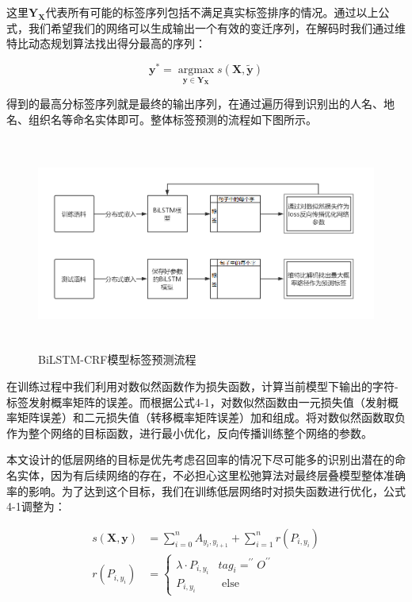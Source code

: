 \documentclass[winfonts,master,oneside,nobackinfo]{njuthesis}
\begin{document}
这里$\bm{Y}_{\bm{X}}$代表所有可能的标签序列包括不满足真实标签排序的情况。通过以上公式，我们希望我们的网络可以生成输出一个有效的变迁序列，在解码时我们通过维特比动态规划算法找出得分最高的序列：

\begin{equation} 
\bm{y}^{*}=\underset{\bm{y} \in \bm{Y}_{\bm{X}}}{\operatorname{argmax}} s(\bm{X}, \widetilde{\bm{y}})
\end{equation}

得到的最高分标签序列就是最终的输出序列，在通过遍历得到识别出的人名、地名、组织名等命名实体即可。整体标签预测的流程如下图所示。

\begin{figure}[H]
\centering
\begin{minipage}[t]{\textwidth}
\includegraphics[width=1\textwidth,height=7cm]{./figure/标签预测流程.jpg}
\caption{BiLSTM-CRF模型标签预测流程}
\label{lab:1}
\end{minipage}
\end{figure}

在训练过程中我们利用对数似然函数作为损失函数，计算当前模型下输出的字符-标签发射概率矩阵的误差。而根据公式4-1，对数似然函数由一元损失值（发射概率矩阵误差）和二元损失值（转移概率矩阵误差）加和组成。将对数似然函数取负作为整个网络的目标函数，进行最小优化，反向传播训练整个网络的参数。

本文设计的低层网络的目标是优先考虑召回率的情况下尽可能多的识别出潜在的命名实体，因为有后续网络的存在，不必担心这里松弛算法对最终层叠模型整体准确率的影响。为了达到这个目标，我们在训练低层网络时对损失函数进行优化，公式4-1调整为：

\begin{equation} 
\begin{split}
s(\bm{X}, \bm{y})&=\sum_{i=0}^{n} A_{y_{i}, y_{i+1}}+\sum_{i=1}^{n} r(P_{i, y_{i}}) \\ 
r\left(P_{i, y_{i}}\right)&=\left\{\begin{array}{ll}{\lambda \cdot P_{i, y_{i}}} & {t a g_{i}=^{\prime \prime} O^{\prime \prime}} \\ {P_{i, y_{i}}} & {\text { else }}\end{array}\right.
\end{split}
\end{equation}
\end{document}
